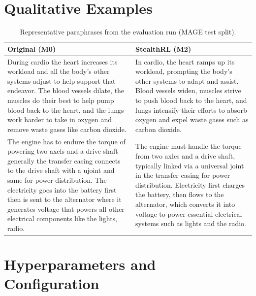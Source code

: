 \documentclass{article} %
\begin{document}



\appendix
\section{Qualitative Examples}
\begin{table}[!ht]
\centering
\small
\setlength{\tabcolsep}{4pt}
\begin{tabularx}{\linewidth}{X X}
\toprule
\textbf{Original (M0)} & \textbf{StealthRL (M2)} \\
\midrule
During cardio the heart increases its workload and all the body's other systems adjust to help support that endeavor. The blood vessels dilate, the muscles do their best to help pump blood back to the heart, and the lungs work harder to take in oxygen and remove waste gases like carbon dioxide. &
In cardio, the heart ramps up its workload, prompting the body's other systems to adapt and assist. Blood vessels widen, muscles strive to push blood back to the heart, and lungs intensify their efforts to absorb oxygen and expel waste gases such as carbon dioxide. \\
\midrule
The engine has to endure the torque of powering two axels and a drive shaft generally the transfer casing connects to the drive shaft with a ujoint and same for power distribution. The electricity goes into the battery first then is sent to the alternator where it generates voltage that powers all other electrical components like the lights, radio. &
The engine must handle the torque from two axles and a drive shaft, typically linked via a universal joint in the transfer casing for power distribution. Electricity first charges the battery, then flows to the alternator, which converts it into voltage to power essential electrical systems such as lights and the radio. \\
\bottomrule
\end{tabularx}
\caption{Representative paraphrases from the evaluation run (MAGE test split).}
\end{table}

\clearpage
\section{Hyperparameters and Configuration}
\label{sec:hyperparams}
\end{document}
